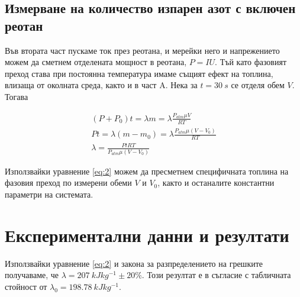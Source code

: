 \documentclass[%
 reprint,
 amsmath,amssymb,
 aps,
]{revtex4-2}
\begin{document}
\subsection{Измерване на количество изпарен азот с включен реотан}
Във втората част пускаме ток през реотана, и мерейки него и напрежението можем да сметнем отделената мощност в реотана, $P = IU$. Тъй като фазовият преход става при постоянна температура имаме същият ефект на топлина, влизаща от околната среда, както и в част A. Нека за $t=30 \ \si{s}$ се отделя обем $V$. Тогава 

\begin{gather*}
    (P + P_0) t = \lambda m = \lambda \frac{P_{atm}\mu V}{RT} \\
    P t = \lambda (m - m_0) = \lambda \frac{P_{atm}\mu (V - V_0)}{RT} \\
    \lambda = \frac{PtRT}{P_{atm}\mu(V - V_0)} \label{eq:2} \tag{2}
\end{gather*}

Използвайки уравнение \eqref{eq:2} можем да пресметнем специфичната топлина на фазовия преход по измерени обеми $V$ и $V_0$, както и останалите константни параметри на системата.
\section{Експериментални данни и резултати}

Използвайки уравнение \eqref{eq:2} и закона за разпределението на грешките получаваме, че $\lambda = 207 \ \si{kJ kg^{-1}} \pm 20\%$. Този резултат е в съгласие с табличната стойност от $\lambda_0 = 198.78 \ \si{kJ kg^{-1}}$.
\end{document}
